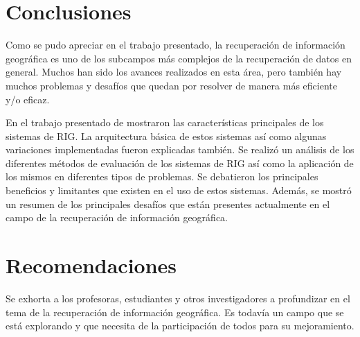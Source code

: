 \documentclass{llncs}
\begin{document}
\section{Conclusiones}\label{sec:conclusions}

Como se pudo apreciar en el trabajo presentado, la recuperación de información
geográfica es uno de los subcampos más complejos de la recuperación de datos
en general. Muchos han sido los avances realizados en esta área, pero también
hay muchos problemas y desafíos que quedan por resolver de manera más eficiente
y/o eficaz.

En el trabajo presentado de mostraron las características principales de los
sistemas de RIG. La arquitectura básica de estos sistemas así como algunas
variaciones implementadas fueron explicadas también. Se realizó un análisis de
los diferentes métodos de evaluación de los sistemas de RIG así como la
aplicación de los mismos en diferentes tipos de problemas. Se debatieron los
principales beneficios y limitantes que existen en el uso de estos sistemas.
Además, se mostró un resumen de los principales desafíos que están presentes
actualmente en el campo de la recuperación de información geográfica.

\section{Recomendaciones}\label{sec:recomend}

Se exhorta a los profesoras, estudiantes y otros investigadores a profundizar
en el tema de la recuperación de información geográfica. Es todavía un
campo que se está explorando y que necesita de la participación de todos
para su mejoramiento.
\end{document}
